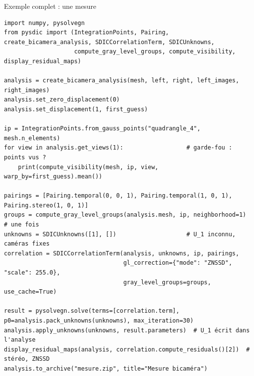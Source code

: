 \documentclass[aspectratio=169,11pt]{beamer}
\begin{document}
\begin{frame}[fragile]{Exemple complet : une mesure}
\begin{lstlisting}[basicstyle=\ttfamily\tiny]
import numpy, pysolvegn
from pysdic import (IntegrationPoints, Pairing, create_bicamera_analysis, SDICCorrelationTerm, SDICUnknowns,
                    compute_gray_level_groups, compute_visibility, display_residual_maps)
 
analysis = create_bicamera_analysis(mesh, left, right, left_images, right_images)
analysis.set_zero_displacement(0)
analysis.set_displacement(1, first_guess)
 
ip = IntegrationPoints.from_gauss_points("quadrangle_4", mesh.n_elements)
for view in analysis.get_views(1):                  # garde-fou : points vus ?
    print(compute_visibility(mesh, ip, view, warp_by=first_guess).mean())
 
pairings = [Pairing.temporal(0, 0, 1), Pairing.temporal(1, 0, 1), Pairing.stereo(1, 0, 1)]
groups = compute_gray_level_groups(analysis.mesh, ip, neighborhood=1)  # une fois
unknowns = SDICUnknowns([1], [])                    # U_1 inconnu, caméras fixes
correlation = SDICCorrelationTerm(analysis, unknowns, ip, pairings,
                                  gl_correction={"mode": "ZNSSD", "scale": 255.0},
                                  gray_level_groups=groups, use_cache=True)
 
result = pysolvegn.solve(terms=[correlation.term], p0=analysis.pack_unknowns(unknowns), max_iteration=30)
analysis.apply_unknowns(unknowns, result.parameters)  # U_1 écrit dans l'analyse
display_residual_maps(analysis, correlation.compute_residuals()[2])  # stéréo, ZNSSD
analysis.to_archive("mesure.zip", title="Mesure bicaméra")
\end{lstlisting}
\end{frame}
\end{document}
